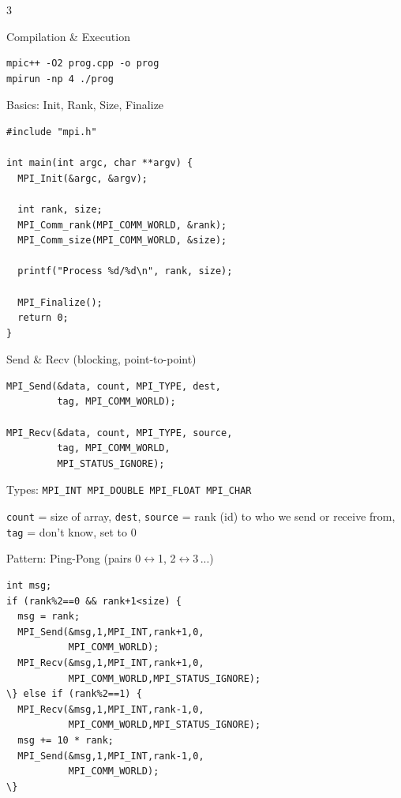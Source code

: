 \documentclass[8pt,a4paper,landscape]{article}
\begin{document}
\begin{multicols}{3}

\begin{sectionbox}{Compilation \& Execution}
\begin{lstlisting}
mpic++ -O2 prog.cpp -o prog
mpirun -np 4 ./prog
\end{lstlisting}
\end{sectionbox}

\begin{sectionbox}{{Basics: Init, Rank, Size, Finalize}}
\begin{lstlisting}
#include "mpi.h"

int main(int argc, char **argv) {
  MPI_Init(&argc, &argv);

  int rank, size;
  MPI_Comm_rank(MPI_COMM_WORLD, &rank);
  MPI_Comm_size(MPI_COMM_WORLD, &size);

  printf("Process %d/%d\n", rank, size);

  MPI_Finalize();
  return 0;
}
\end{lstlisting}
\end{sectionbox}

\begin{highlightbox}{{ Send \& Recv (blocking, point-to-point) }}
\begin{lstlisting}
MPI_Send(&data, count, MPI_TYPE, dest,
         tag, MPI_COMM_WORLD);

MPI_Recv(&data, count, MPI_TYPE, source,
         tag, MPI_COMM_WORLD,
         MPI_STATUS_IGNORE);
\end{lstlisting}
\vspace{2pt}
{\scriptsize Types: \texttt{MPI\_INT \; MPI\_DOUBLE \; MPI\_FLOAT \; MPI\_CHAR}}

{\scriptsize \texttt{count} = size of array, \texttt{dest}, \texttt{source} = rank (id) to who we send or receive from, \texttt{tag} = don't know, set to 0}
\end{highlightbox}

\begin{sectionbox}{{ Pattern: Ping-Pong (pairs 0$\leftrightarrow$1, 2$\leftrightarrow$3\,...) }}
\begin{lstlisting}
int msg;
if (rank%2==0 && rank+1<size) {
  msg = rank;
  MPI_Send(&msg,1,MPI_INT,rank+1,0,
           MPI_COMM_WORLD);
  MPI_Recv(&msg,1,MPI_INT,rank+1,0,
           MPI_COMM_WORLD,MPI_STATUS_IGNORE);
\} else if (rank%2==1) {
  MPI_Recv(&msg,1,MPI_INT,rank-1,0,
           MPI_COMM_WORLD,MPI_STATUS_IGNORE);
  msg += 10 * rank;
  MPI_Send(&msg,1,MPI_INT,rank-1,0,
           MPI_COMM_WORLD);
\}
\end{lstlisting}
\end{sectionbox}


\end{multicols}
\end{document}
